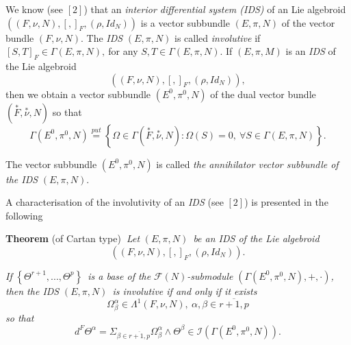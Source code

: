 \documentclass[11pt]{article}
\begin{document}
We know (see $\left[ 2\right] $) that an \emph{interior differential system
(IDS)} of an Lie algebroid $\left( \left( F,\nu ,N\right) ,\left[ ,\right]
_{F},\left( \rho ,Id_{N}\right) \right) $ is a vector subbundle $\left(
E,\pi ,N\right) $ of the vector bundle $\left( F,\nu ,N\right) $. The \emph{%
IDS} $\left( E,\pi ,N\right) $ is called \emph{involutive} if $\left[ S,T%
\right] _{F}\in \Gamma \left( E,\pi ,N\right) ,~$for any $S,T\in \Gamma
\left( E,\pi ,N\right) .$ If $\left( E,\pi ,M\right) $ is an \emph{IDS} of
the Lie algebroid
\begin{equation*}
\left( \left( F,\nu ,N\right) ,\left[ ,\right] _{F},\left( \rho
,Id_{N}\right) \right) ,
\end{equation*}%
then we obtain a vector subbundle $\left( E^{0},\pi ^{0},N\right) $ of the
dual vector bundle $\left( \overset{\ast }{F},\overset{\ast }{\nu },N\right)
$ so that
\begin{equation*}
\Gamma \left( E^{0},\pi ^{0},N\right) \overset{put}{=}\left\{ \Omega \in
\Gamma \left( \overset{\ast }{F},\overset{\ast }{\nu },N\right) :\Omega
\left( S\right) =0,~\forall S\in \Gamma \left( E,\pi ,N\right) \right\} .
\end{equation*}

The vector subbundle $\left( E^{0},\pi ^{0},N\right) $ is called \emph{the
annihilator vector subbundle of the IDS }$\left( E,\pi ,N\right) .$

A characterisation of the involutivity of an \emph{IDS} (see $\left[ 2\right]
$) is presented in the following

\textbf{Theorem} (of Cartan type)\textbf{\ }\emph{Let }$\left( E,\pi
,N\right) $\emph{\ be an IDS of the Lie algebroid }%
\begin{equation*}
\left( \left( F,\nu ,N\right) ,\left[ ,\right] _{F},\left( \rho
,Id_{N}\right) \right) .
\end{equation*}

\emph{If }$\left\{ \Theta ^{r+1},...,\Theta ^{p}\right\} $\emph{\ is a base
of the }$\mathcal{F}\left( N\right) $\emph{-submodule }$\left( \Gamma \left(
E^{0},\pi ^{0},N\right) ,+,\cdot \right) $\emph{, then the IDS }$\left(
E,\pi ,N\right) $\emph{\ is involutive if and only if it exists }%
\begin{equation*}
\Omega _{\beta }^{\alpha }\in \Lambda ^{1}\left( F,\nu ,N\right) ,~\alpha
,\beta \in \overline{r+1,p}
\end{equation*}%
\emph{so that}
\begin{equation*}
d^{F}\Theta ^{\alpha }=\Sigma _{\beta \in \overline{r+1,p}}\Omega _{\beta
}^{\alpha }\wedge \Theta ^{\beta }\in \mathcal{I}\left( \Gamma \left(
E^{0},\pi ^{0},N\right) \right) .
\end{equation*}
\end{document}
